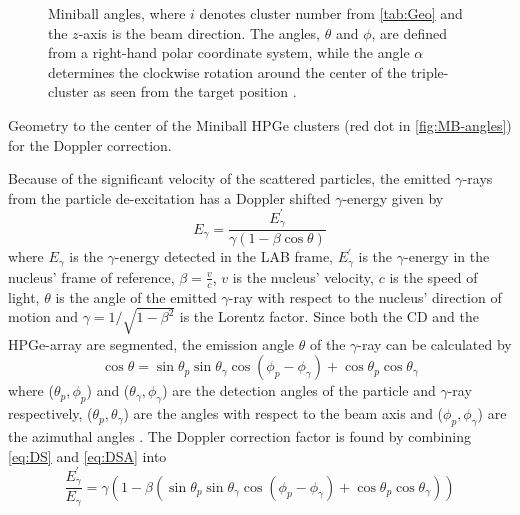 \documentclass[twoside,english]{uiofysmaster/uiofysmaster}
\newcommand{\ga}{$\gamma$}
\let\orgautoref\autoref
\renewcommand{\autoref}
        {%
		 \def\subsectionautorefname{Section}%
		 \def\subsubsectionautorefname{Section}%
          \orgautoref}
\begin{document}
\begin{figure}[ht]
	\centering
	
	\caption{Miniball angles, where $i$ denotes cluster number from \autoref{tab:Geo} and the $z$-axis is the beam direction. The angles, $\theta$ and $\phi$, are defined from a right-hand polar coordinate system, while the angle $\alpha$ determines the clockwise rotation around the center of the triple-cluster as seen from the target position \cite{NWarr-Angles, Rosiak}.}
	\label{fig:MB-angles}
\end{figure}


\begin{table}[ht] 
	\centering 
	\caption{Geometry to the center of the Miniball HPGe clusters (red dot in \autoref{fig:MB-angles}) for the Doppler correction.}
	
	\label{tab:Geo}
\end{table}


Because of the significant velocity of the scattered particles, the emitted \ga-rays from the particle de-excitation has a Doppler shifted \ga-energy given by 
\begin{equation}\label{eq:DS}
	E_\gamma = \frac{E_\gamma^{'}}{\gamma (1 - \beta \cos \theta)}
\end{equation}
where $E_\gamma$ is the \ga-energy detected in the LAB frame, $E_\gamma^{'}$ is the \ga-energy in the nucleus' frame of reference, $\beta = \frac{v}{c}$, $v$ is the nucleus' velocity, $c$ is the speed of light, $\theta$ is the angle of the emitted \ga-ray with respect to the nucleus' direction of motion and $\gamma = 1/\sqrt{1 - \beta^2}$ is the Lorentz factor. Since both the CD and the HPGe-array are segmented, the emission angle $\theta$ of the \ga-ray can be calculated by 
\begin{equation}\label{eq:DSA}
	\cos \theta = \sin \theta_p \sin \theta_\gamma \cos (\phi_p - \phi_\gamma) + \cos \theta_p \cos \theta_\gamma
\end{equation}
where ($\theta_p, \phi_p$) and ($\theta_\gamma, \phi_\gamma$) are the detection angles of the particle and \ga-ray respectively, ($\theta_p, \theta_\gamma$) are the angles with respect to the beam axis and ($\phi_p, \phi_\gamma$) are the azimuthal angles \cite{RIBF2012, MB-spect}. The Doppler correction factor is found by combining \autoref{eq:DS} and \autoref{eq:DSA} into
\begin{equation}
	\frac{E_\gamma^{'}}{E_\gamma} = \gamma (1 - \beta (\sin \theta_p \sin \theta_\gamma \cos (\phi_p - \phi_\gamma) + \cos \theta_p \cos \theta_\gamma))
\end{equation}
\end{document}
